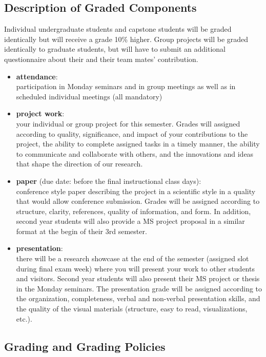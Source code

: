 \documentclass[letterpaper,oneside,10pt]{scrartcl}
\begin{document}
    \subsection{Description of Graded Components}
        Individual undergraduate students and capstone students will be graded identically but will receive a grade 10\% higher. Group projects will be graded identically to graduate students, but will have to submit an additional questionnaire about their and their team mates' contribution.
        \begin{itemize}
            \item   \textbf{attendance}:\\ participation in Monday seminars and in group meetings as well as in scheduled individual meetings (all mandatory)
            \item   \textbf{project work}:\\ your individual or group project for this semester. Grades will assigned according to quality, significance, and impact of your contributions to the project, the ability to complete assigned tasks in a timely manner, the ability to communicate and collaborate with others, and the innovations and ideas that shape the direction of our research.
            \item   \textbf{paper} (due date: before the final instructional class days):\\ conference style paper describing the project in a scientific style in a quality that would allow conference submission. Grades will be assigned according to structure, clarity, references, quality of information, and form. In addition, second year students will also provide a MS project proposal in a similar format at the begin of their 3rd semester.
            \item   \textbf{presentation}:\\ there will be a research showcase at the end of the semester (assigned slot during final exam week) where you will present your work to other students and visitors. Second year students will also present their MS project or thesis in the Monday seminars. The presentation grade will be assigned according to the organization, completeness, verbal and non-verbal presentation skills, and the quality of the visual materials (structure, easy to read, visualizations, etc.).
        \end{itemize}
        
    \subsection{Grading and Grading Policies}
         
\end{document}
